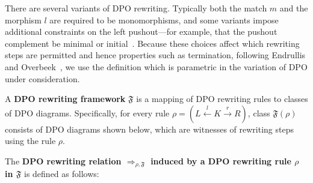 There are several variants of DPO rewriting. Typically both the match $m$ and the morphism $l$ are required to be monomorphisms, and some variants impose additional constraints on the left pushout—for example, that the pushout complement be minimal or initial~\cite{braatz2011delete,behr2021concurrency,behr2023fundamentals}. Because these choices affect which rewriting steps are permitted and hence properties such as termination, following Endrullis and Overbeek~\cite{endrullis2024generalized_icgt}, we use the definition which is parametric in the variation of DPO under consideration.
\begin{definition}
  \label{def:rewriting_framework} 
    A \textbf{DPO rewriting framework} $\mathfrak{F}$ is a mapping of DPO rewriting rules to classes of DPO diagrams. Specifically, for every rule \( \rho \mathop{=} (L \overset{l}{\leftarrow} K \overset{r}{\rightarrow} R) \), class $\mathfrak{F}(\rho)$ consists of DPO diagrams shown below, which are witnesses of rewriting steps using the rule \( \rho \).
\begin{center}
    \end{center}
    The \textbf{DPO rewriting relation $\mathop{\Rightarrow}_{\rho,\mathfrak{F}}$ induced by a DPO rewriting rule $\rho$ in $\mathfrak{F}$} is defined as follows:

\end{definition}

